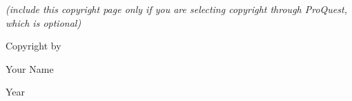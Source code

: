 
\vspace*{32\baselineskip}
\centerline{\textit{(include this copyright page only if you are selecting copyright through ProQuest, which is optional)}}
\vspace*{1\baselineskip}
\centerline{Copyright by}
\centerline{Your Name}
\centerline{Year}